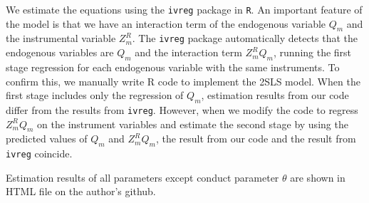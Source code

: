 \documentclass[11pt, a4paper]{article}
\begin{document}
We estimate the equations using the \texttt{ivreg} package in \texttt{R}.
An important feature of the model is that we have an interaction term of the endogenous variable $Q_{m}$ and the instrumental variable $Z^{R}_{m}$.
The \texttt{ivreg} package automatically detects that the endogenous variables are $Q_{m}$ and the interaction term $Z^{R}_{m}Q_{m}$, running the first stage regression for each endogenous variable with the same instruments. To confirm this, we manually write R code to implement the 2SLS model. 
When the first stage includes only the regression of $Q_{m}$, estimation results from our code differ from the results from \texttt{ivreg}. 
However, when we modify the code to regress $Z^{R}_{m}Q_{m}$ on the instrument variables and estimate the second stage by using the predicted values of $Q_{m}$ and $Z^{R}_{m}Q_{m}$, the result from our code and the result from \texttt{ivreg} coincide.

Estimation results of all parameters except conduct parameter $\theta$ are shown in HTML file on the author's github.
\end{document}
